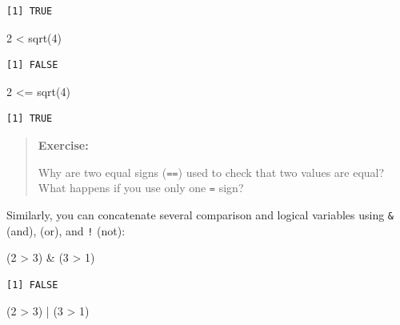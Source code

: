 \documentclass[
  letterpaper,
  DIV=11,
  numbers=noendperiod]{scrreprt}
\newenvironment{Shaded}{\begin{snugshade}}{\end{snugshade}}
\newcommand{\DecValTok}[1]{\textcolor[rgb]{0.68,0.00,0.00}{#1}}
\newcommand{\FunctionTok}[1]{\textcolor[rgb]{0.28,0.35,0.67}{#1}}
\newcommand{\NormalTok}[1]{\textcolor[rgb]{0.00,0.23,0.31}{#1}}
\newcommand{\SpecialCharTok}[1]{\textcolor[rgb]{0.37,0.37,0.37}{#1}}
\begin{document}
\begin{verbatim}
[1] TRUE
\end{verbatim}

\begin{Shaded}
\begin{Highlighting}[]
\DecValTok{2} \SpecialCharTok{\textless{}} \FunctionTok{sqrt}\NormalTok{(}\DecValTok{4}\NormalTok{)}
\end{Highlighting}
\end{Shaded}

\begin{verbatim}
[1] FALSE
\end{verbatim}

\begin{Shaded}
\begin{Highlighting}[]
\DecValTok{2} \SpecialCharTok{\textless{}=} \FunctionTok{sqrt}\NormalTok{(}\DecValTok{4}\NormalTok{)}
\end{Highlighting}
\end{Shaded}

\begin{verbatim}
[1] TRUE
\end{verbatim}

\begin{quote}
\textbf{Exercise:}

Why are two equal signs (\texttt{==}) used to check that two values are
equal? What happens if you use only one \texttt{=} sign?
\end{quote}

Similarly, you can concatenate several comparison and logical variables
using \texttt{\&} (and), \texttt{\textbar{}} (or), and \texttt{!} (not):

\begin{Shaded}
\begin{Highlighting}[]
\NormalTok{(}\DecValTok{2} \SpecialCharTok{\textgreater{}} \DecValTok{3}\NormalTok{) }\SpecialCharTok{\&}\NormalTok{ (}\DecValTok{3} \SpecialCharTok{\textgreater{}} \DecValTok{1}\NormalTok{)}
\end{Highlighting}
\end{Shaded}

\begin{verbatim}
[1] FALSE
\end{verbatim}

\begin{Shaded}
\begin{Highlighting}[]
\NormalTok{(}\DecValTok{2} \SpecialCharTok{\textgreater{}} \DecValTok{3}\NormalTok{) }\SpecialCharTok{|}\NormalTok{ (}\DecValTok{3} \SpecialCharTok{\textgreater{}} \DecValTok{1}\NormalTok{)}
\end{Highlighting}
\end{Shaded}
\end{document}
